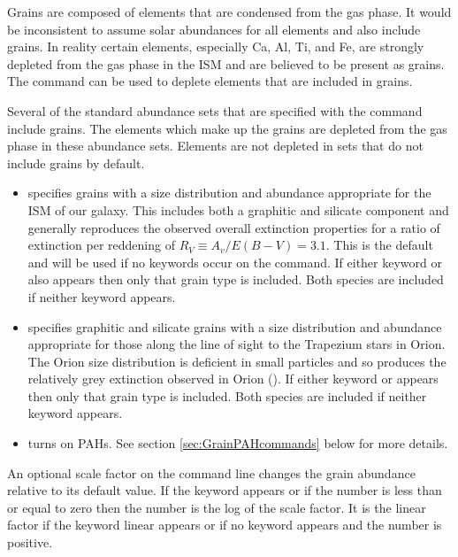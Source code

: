 Grains are composed of elements that are condensed from the gas phase.
It would be inconsistent to assume solar abundances for all elements and
also include grains.
In reality certain elements, especially Ca, Al, Ti,
and Fe, are strongly depleted from the gas phase in the ISM
and are believed to be present as grains.
The  command can be used
to deplete elements that are included in grains.

Several of the standard abundance sets that are specified with the
 command include grains.
The elements which make
up the grains are depleted from the gas phase in these abundance sets.
Elements are not depleted in sets that do not include grains by default.

\begin{itemize}
\item {}  specifies grains
with a size distribution
and abundance appropriate for the ISM of our galaxy.
This includes both a graphitic and
silicate component and generally reproduces the observed overall
extinction
properties for a ratio of extinction per reddening of
$R_V \equiv A_v/E(B-V) = 3.1$.
This is the default and will be used if no keywords occur on the
 command.
If either keyword  or  also
appears then only that grain type is included.
Both species are included if neither keyword appears.

\item {}
specifies graphitic and silicate grains with a size distribution and
abundance appropriate for those along the line of sight to the Trapezium
stars in Orion.
The Orion size distribution is deficient in small particles
and so produces the relatively grey extinction observed in
Orion (\citealp{Baldwin1991}).
If either keyword  or  appears
then only that grain type is included.
Both species are included if neither keyword appears.

\item {} turns on PAHs.
See section \ref{sec:GrainPAHcommands} below for more details.
\end{itemize}

  An optional scale factor
on the command line changes
the grain abundance relative to its default value.
If the keyword 
appears or if the number is less than or equal to zero
then the number is the log of the scale factor.
It is the linear factor if the keyword linear
appears or if no keyword appears and the number is positive.

